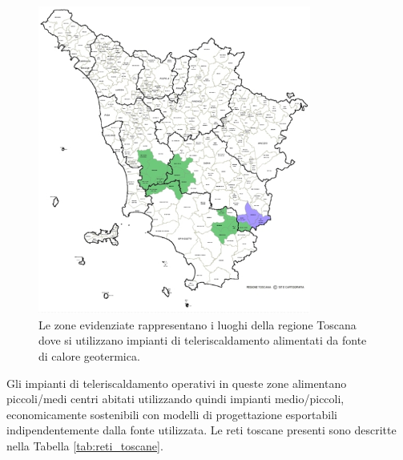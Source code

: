 \documentclass[laurea,oneside,11pt]{USiena_tesiLM3}
\begin{document}
\begin{figure}[!ht]
\centering
\includegraphics[width=0.8\textwidth]{figure/toscana}
\caption{Le zone evidenziate rappresentano i luoghi della regione Toscana dove si utilizzano impianti di teleriscaldamento alimentati da fonte di calore geotermica.}
\label{fig:toscana}
\end{figure}

Gli impianti di teleriscaldamento operativi in queste zone alimentano  piccoli/medi centri abitati utilizzando quindi impianti medio/piccoli, economicamente sostenibili con modelli di progettazione esportabili indipendentemente dalla fonte utilizzata. Le reti toscane presenti sono descritte nella Tabella \ref{tab:reti_toscane}.
\end{document}

